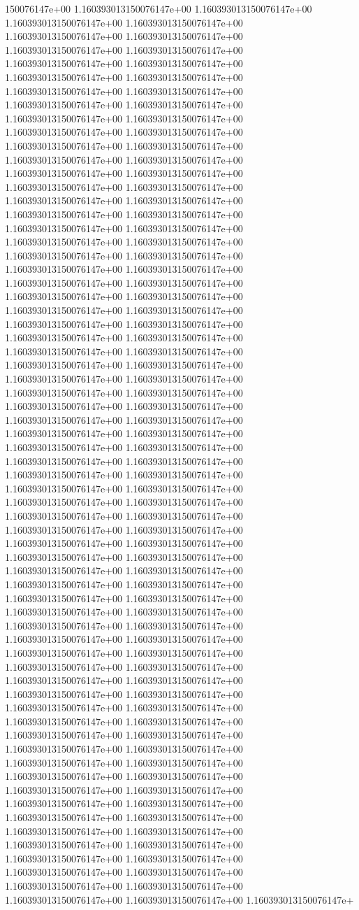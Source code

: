 150076147e+00	1.160393013150076147e+00	1.160393013150076147e+00	1.160393013150076147e+00	1.160393013150076147e+00	1.160393013150076147e+00	1.160393013150076147e+00	1.160393013150076147e+00	1.160393013150076147e+00	1.160393013150076147e+00	1.160393013150076147e+00	1.160393013150076147e+00	1.160393013150076147e+00	1.160393013150076147e+00	1.160393013150076147e+00	1.160393013150076147e+00	1.160393013150076147e+00	1.160393013150076147e+00	1.160393013150076147e+00	1.160393013150076147e+00	1.160393013150076147e+00	1.160393013150076147e+00	1.160393013150076147e+00	1.160393013150076147e+00	1.160393013150076147e+00	1.160393013150076147e+00	1.160393013150076147e+00	1.160393013150076147e+00	1.160393013150076147e+00	1.160393013150076147e+00	1.160393013150076147e+00	1.160393013150076147e+00	1.160393013150076147e+00	1.160393013150076147e+00	1.160393013150076147e+00	1.160393013150076147e+00	1.160393013150076147e+00	1.160393013150076147e+00	1.160393013150076147e+00	1.160393013150076147e+00	1.160393013150076147e+00	1.160393013150076147e+00	1.160393013150076147e+00	1.160393013150076147e+00	1.160393013150076147e+00	1.160393013150076147e+00	1.160393013150076147e+00	1.160393013150076147e+00	1.160393013150076147e+00	1.160393013150076147e+00	1.160393013150076147e+00	1.160393013150076147e+00	1.160393013150076147e+00	1.160393013150076147e+00	1.160393013150076147e+00	1.160393013150076147e+00	1.160393013150076147e+00	1.160393013150076147e+00	1.160393013150076147e+00	1.160393013150076147e+00	1.160393013150076147e+00	1.160393013150076147e+00	1.160393013150076147e+00	1.160393013150076147e+00	1.160393013150076147e+00	1.160393013150076147e+00	1.160393013150076147e+00	1.160393013150076147e+00	1.160393013150076147e+00	1.160393013150076147e+00	1.160393013150076147e+00	1.160393013150076147e+00	1.160393013150076147e+00	1.160393013150076147e+00	1.160393013150076147e+00	1.160393013150076147e+00	1.160393013150076147e+00	1.160393013150076147e+00	1.160393013150076147e+00	1.160393013150076147e+00	1.160393013150076147e+00	1.160393013150076147e+00	1.160393013150076147e+00	1.160393013150076147e+00	1.160393013150076147e+00	1.160393013150076147e+00	1.160393013150076147e+00	1.160393013150076147e+00	1.160393013150076147e+00	1.160393013150076147e+00	1.160393013150076147e+00	1.160393013150076147e+00	1.160393013150076147e+00	1.160393013150076147e+00	1.160393013150076147e+00	1.160393013150076147e+00	1.160393013150076147e+00	1.160393013150076147e+00	1.160393013150076147e+00	1.160393013150076147e+00	1.160393013150076147e+00	1.160393013150076147e+00	1.160393013150076147e+00	1.160393013150076147e+00	1.160393013150076147e+00	1.160393013150076147e+00	1.160393013150076147e+00	1.160393013150076147e+00	1.160393013150076147e+00	1.160393013150076147e+00	1.160393013150076147e+00	1.160393013150076147e+00	1.160393013150076147e+00	1.160393013150076147e+00	1.160393013150076147e+00	1.160393013150076147e+00	1.160393013150076147e+00	1.160393013150076147e+00	1.160393013150076147e+00	1.160393013150076147e+00	1.160393013150076147e+00	1.160393013150076147e+00	1.160393013150076147e+00	1.160393013150076147e+00	1.160393013150076147e+00	1.160393013150076147e+00	1.160393013150076147e+00	1.160393013150076147e+00	1.160393013150076147e+00	1.160393013150076147e+00	1.160393013150076147e+00	1.160393013150076147e+00	1.160393013150076147e+00	1.160393013150076147e+